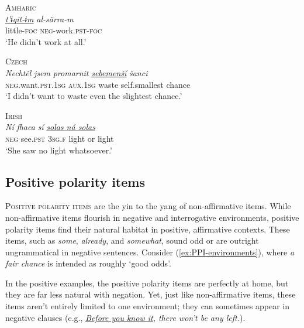 \begin{tcolorbox}[title=Non-affirmative items in other languages, colback=white]
\ea \textsc{Amharic}\\
\gll \textit{\uline{t'ɨqit-ɨm}} \textit{al-särra-m}\\
     little-\textsc{foc} \textsc{neg}-work.\textsc{pst-foc}\\
\glt `He didn't work at all.'
\z

\ea \textsc{Czech}\\
\gll \textit{Nechtěl} \textit{jsem} \textit{promarnit} \textit{\uline{sebemenší}} \textit{šanci}\\
     \textsc{neg}.want.\textsc{pst.1sg} \textsc{aux.1sg} waste self.smallest chance\\
\glt `I didn't want to waste even the slightest chance.'
\z

\ea \textsc{Irish}\\
\gll \textit{Ní} \textit{fhaca} \textit{sí} \textit{\uline{solas ná solas}}\\
     \textsc{neg} see.\textsc{pst} \textsc{3sg.f} {light or light}\\
\glt `She saw no light whatsoever.'
\z

    
\end{tcolorbox}


\subsection{Positive polarity items}

\textsc{Positive polarity items} are the yin to the yang of non-affirmative items. While non-affirmative items flourish in negative and interrogative environments, positive polarity items find their natural habitat in positive, affirmative contexts. These items, such as \textit{some}, \textit{already}, and \textit{somewhat}, sound odd or are outright ungrammatical in negative sentences. Consider (\ref{ex:PPI-environments}), where \textit{a fair chance} is intended as roughly `good odds'.

\ea \label{ex:PPI-environments}
    \ea
        \z
    \ex
        \z
    \z
\z

In the positive examples, the positive polarity items are perfectly at home, but they are far less natural with negation. Yet, just like non-affirmative items, these items aren't entirely limited to one environment; they can sometimes appear in negative clauses (e.g., \textit{\uline{Before you know it,} there won't be any left.}).

